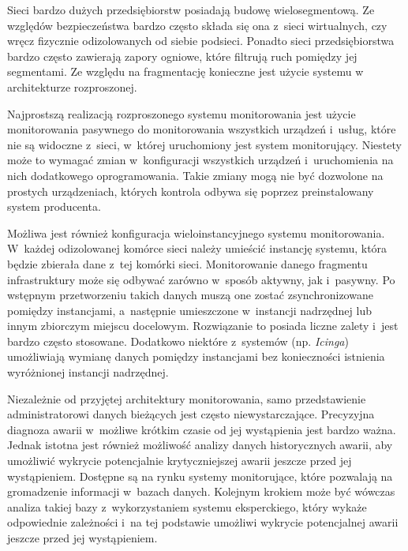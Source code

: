 Sieci bardzo dużych przedsiębiorstw posiadają budowę
wielosegmentową. Ze względów bezpieczeństwa bardzo często składa się
ona z~sieci wirtualnych, czy wręcz fizycznie odizolowanych od siebie
podsieci. Ponadto sieci przedsiębiorstwa bardzo często zawierają
zapory ogniowe, które filtrują ruch pomiędzy jej segmentami. Ze
względu na fragmentację konieczne jest użycie systemu w architekturze
rozproszonej.

Najprostszą realizacją rozproszonego systemu monitorowania jest użycie
monitorowania pasywnego do monitorowania wszystkich urządzeń i~usług,
które nie są widoczne z~sieci, w~której uruchomiony jest system
monitorujący. Niestety może to wymagać zmian w~konfiguracji wszystkich
urządzeń i~uruchomienia na nich dodatkowego oprogramowania. Takie
zmiany mogą nie być dozwolone na prostych urządzeniach, których
kontrola odbywa się poprzez preinstalowany system producenta.

Możliwa jest również konfiguracja wieloinstancyjnego systemu
monitorowania. W~każdej odizolowanej komórce sieci należy umieścić
instancję systemu, która będzie zbierała dane z~tej komórki
sieci. Monitorowanie danego fragmentu infrastruktury może się odbywać
zarówno w~sposób aktywny, jak i~pasywny. Po wstępnym przetworzeniu
takich danych muszą one zostać zsynchronizowane pomiędzy instancjami,
a~następnie umieszczone w~instancji nadrzędnej lub innym zbiorczym
miejscu docelowym. Rozwiązanie to posiada liczne zalety i~jest bardzo
często stosowane. Dodatkowo niektóre z~systemów (np. {\em Icinga})
umożliwiają wymianę danych pomiędzy instancjami bez konieczności
istnienia wyróżnionej instancji nadrzędnej.

Niezależnie od przyjętej architektury monitorowania, samo
przedstawienie administratorowi danych bieżących jest często
niewystarczające. Precyzyjna diagnoza awarii w~możliwe krótkim czasie
od jej wystąpienia jest bardzo ważna. Jednak istotna jest również
możliwość analizy danych historycznych awarii, aby umożliwić wykrycie
potencjalnie krytyczniejszej awarii jeszcze przed jej
wystąpieniem. Dostępne są na rynku systemy monitorujące, które
pozwalają na gromadzenie informacji w~bazach danych. Kolejnym krokiem
może być wówczas analiza takiej bazy z~wykorzystaniem systemu
eksperckiego, który wykaże odpowiednie zależności i~na tej podstawie
umożliwi wykrycie potencjalnej awarii jeszcze przed jej wystąpieniem.

